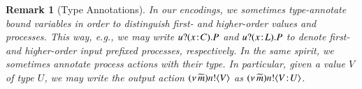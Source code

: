 \documentclass[preprint,11pt]{elsarticle}
\newtheorem{remark}{Remark}[section]
\begin{document}
{\begin{remark}[Type Annotations]\label{r:types}
In our encodings, we sometimes type-annotate
bound variables in order to distinguish first- and higher-order values and processes.
This way, e.g., 
we may write $u ? (x \! : \! C) . P$
and 
$u ? (x \! : \! L) . P$ to denote first- and higher-order input prefixed processes, respectively.
In the same spirit, we sometimes annotate process actions with their type. In particular, 
given a value $V$ of type $U$, we may write the output action 
$(\nu\, \widetilde{m}) n ! \langle V \rangle$
as $(\nu\, \widetilde{m}) n ! \langle V \! : \! U \rangle$.
\end{remark}

}
\end{document}

